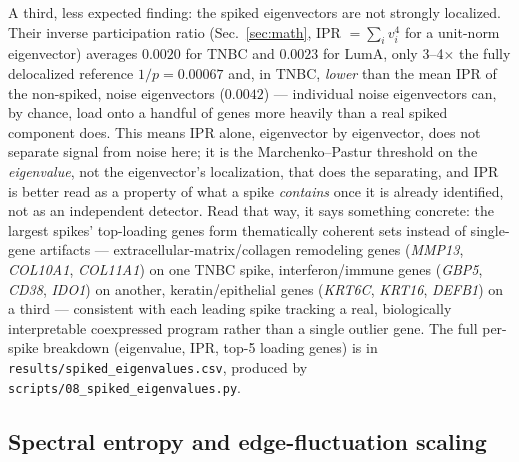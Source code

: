 \documentclass[11pt]{article}
\begin{document}
A third, less expected finding: the spiked eigenvectors are not
strongly localized. Their inverse participation ratio
(Sec.~\ref{sec:math}, IPR $=\sum_i v_i^4$ for a unit-norm eigenvector)
averages $0.0020$ for TNBC and $0.0023$ for LumA, only 3--4$\times$ the
fully delocalized reference $1/p=0.00067$ and, in TNBC,
\emph{lower} than the mean IPR of the non-spiked, noise eigenvectors
($0.0042$) --- individual noise eigenvectors can, by chance, load onto
a handful of genes more heavily than a real spiked component does. This
means IPR alone, eigenvector by eigenvector, does not separate signal
from noise here; it is the Marchenko--Pastur threshold on the
\emph{eigenvalue}, not the eigenvector's localization, that does the
separating, and IPR is better read as a property of what a spike
\emph{contains} once it is already identified, not as an independent
detector. Read that way, it says something concrete: the largest
spikes' top-loading genes form thematically coherent sets instead of
single-gene artifacts --- extracellular-matrix/collagen remodeling
genes (\emph{MMP13}, \emph{COL10A1}, \emph{COL11A1}) on one TNBC spike,
interferon/immune genes (\emph{GBP5}, \emph{CD38}, \emph{IDO1}) on
another, keratin/epithelial genes (\emph{KRT6C}, \emph{KRT16},
\emph{DEFB1}) on a third --- consistent with each leading spike
tracking a real, biologically interpretable coexpressed program rather
than a single outlier gene. The full per-spike breakdown (eigenvalue,
IPR, top-5 loading genes) is in
\texttt{results/spiked\_eigenvalues.csv}, produced by
\texttt{scripts/08\_spiked\_eigenvalues.py}.

\subsection{Spectral entropy and edge-fluctuation scaling}
\label{sec:entropy}
\end{document}
